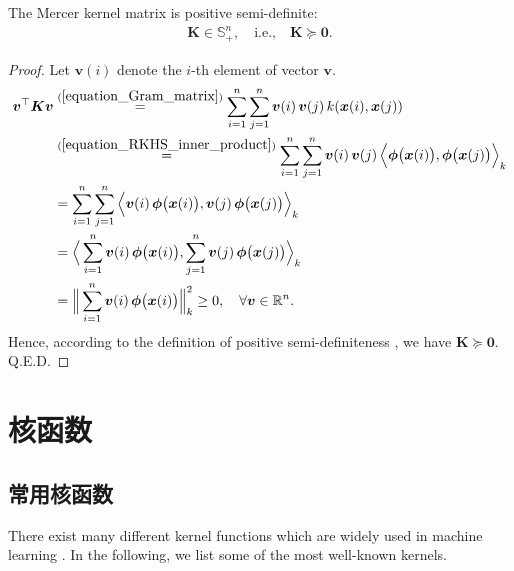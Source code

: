 \documentclass[lang=cn,10pt]{gorgeousnbook}
\numberwithin{equation}{section}%
\numberwithin{figure}{section}%
\begin{document}
\begin{lemma}\label{lemma_kernel_is_positive_semidefinite}
The Mercer kernel matrix is positive semi-definite:
\begin{align}
\boldsymbol{K} \in \mathbb{S}_{+}^n, \quad \text{i.e.,} \quad \boldsymbol{K} \succeq \boldsymbol{0}.
\end{align}
\end{lemma}
\begin{proof}
Let $\boldsymbol{v}(i)$ denote the $i$-th element of vector $\boldsymbol{v}$.
\begin{align*}
\boldsymbol{v}^\top \boldsymbol{K} \boldsymbol{v} &\overset{(\ref{equation_Gram_matrix})}{=} \sum_{i=1}^n \sum_{j=1}^n \boldsymbol{v}(i)\, \boldsymbol{v}(j)\, k(\boldsymbol{x}(i), \boldsymbol{x}(j)) \\
&\overset{(\ref{equation_RKHS_inner_product})}{=} \sum_{i=1}^n \sum_{j=1}^n \boldsymbol{v}(i)\, \boldsymbol{v}(j)\, \Big\langle \boldsymbol{\phi}\big(\boldsymbol{x}(i)\big), \boldsymbol{\phi}\big(\boldsymbol{x}(j)\big) \Big\rangle_k \\
&= \sum_{i=1}^n \sum_{j=1}^n \Big\langle \boldsymbol{v}(i)\, \boldsymbol{\phi}\big(\boldsymbol{x}(i)\big), \boldsymbol{v}(j)\, \boldsymbol{\phi}\big(\boldsymbol{x}(j)\big) \Big\rangle_k \\
&= \Big\langle \sum_{i=1}^n \boldsymbol{v}(i)\, \boldsymbol{\phi}\big(\boldsymbol{x}(i)\big), \sum_{j=1}^n \boldsymbol{v}(j)\, \boldsymbol{\phi}\big(\boldsymbol{x}(j)\big) \Big\rangle_k \\
&= \Big\| \sum_{i=1}^n \boldsymbol{v}(i)\, \boldsymbol{\phi}\big(\boldsymbol{x}(i)\big) \Big\|_k^2 \geq 0, \quad \forall \boldsymbol{v} \in \mathbb{R}^n. 
\end{align*}
Hence, according to the definition of positive semi-definiteness \cite{bhatia2009positive}, we have $\boldsymbol{K} \succeq \boldsymbol{0}$. Q.E.D.
\end{proof}


\section{核函数}\label{section_well_known_kernels}

\subsection{常用核函数}

There exist many different kernel functions which are widely used in machine learning \cite{rojo2018digital}. In the following, we list some of the most well-known kernels. 
\end{document}
